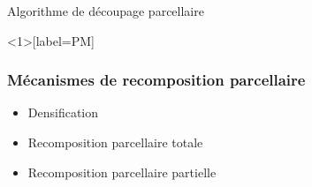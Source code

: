 \documentclass[xcolor=table]{beamer}
\begin{document}
\begin{frame}{Algorithme de découpage parcellaire}
\end{frame}
	
\begin{frame}<1>[label=PM]
	\frametitle{Mécanismes de recomposition parcellaire}
	\begin{itemize}
		\item \alert<1>{Densification}
		\item \alert<2>{Recomposition parcellaire totale}
		\item \alert<2>{Recomposition parcellaire partielle}
	\end{itemize}
\end{frame}
\end{document}
